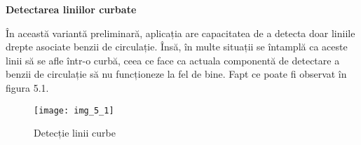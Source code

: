 \textbf{Detectarea liniilor curbate}

În această variantă preliminară, aplicația are capacitatea de a detecta doar liniile drepte asociate benzii de circulație. Însă, în multe situații se întamplă ca aceste linii să se afle într-o curbă, ceea ce face ca actuala componentă de detectare a benzii de circulație să nu funcționeze la fel de bine. Fapt ce poate fi observat în figura 5.1.

\renewcommand{\thefigure}{5.\arabic{figure}}
\setcounter{figure}{0}
\begin{figure}[!h]
	\centering
	\texttt{[image: img\_5\_1]}
	\caption{Detecție linii curbe}
\end{figure} 